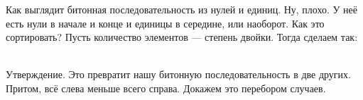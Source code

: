 \documentclass{article}
\begin{document}
    Как выглядит битонная последовательность из нулей и единиц. Ну, плохо. У неё есть нули в начале и конце и единицы в середине, или наоборот. Как это сортировать?
    Пусть количество элементов --- степень двойки. Тогда сделаем так:\\
    \\
    Утверждение. Это превратит нашу битонную последовательность в две других. Притом, всё слева меньше всего справа. Докажем это перебором случаев.\\
\end{document}
